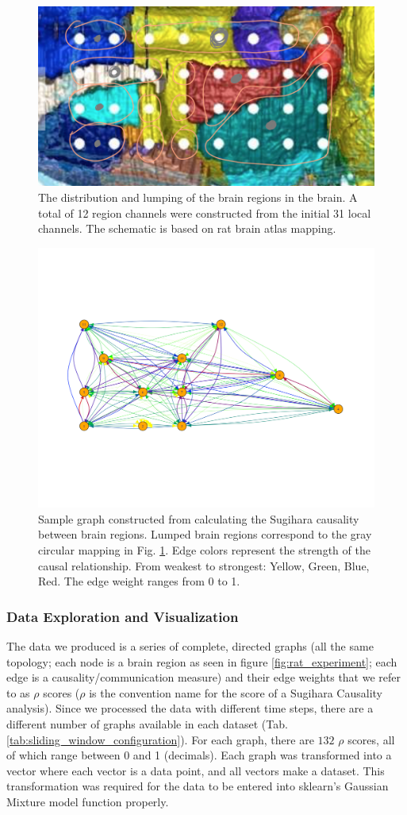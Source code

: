 \begin{figure}[H]
  \centering
  \includegraphics[width=0.65\linewidth]{figures/brain_region_lump.png}
  \caption{The distribution and lumping of the brain regions in the brain. A total of 12 region channels were constructed from the initial 31 local channels. The schematic is based on rat brain atlas mapping.}
  \label{fig:brain_region_lumping}
\end{figure}


\begin{figure}[H]
  \centering
  \includegraphics[width=0.55\linewidth]{figures/sample_graph.pdf}
  \caption{Sample graph constructed from calculating the Sugihara causality between brain regions. Lumped brain regions correspond to the gray circular mapping in Fig. \ref{fig:brain_region_lumping}. Edge colors represent the strength of the causal relationship. From weakest to strongest: Yellow, Green, Blue, Red. The edge weight ranges from 0 to 1.}
  \label{fig:sample_graph}
\end{figure}


\subsubsection{Data Exploration and Visualization}
The data we produced is a series of complete, directed graphs (all the same topology; each node is a brain region as seen in figure \ref{fig:rat_experiment}; each edge is a causality/communication measure) and their edge weights that we refer to as $\rho$ scores ($\rho$ is the convention name for the score of a Sugihara Causality analysis). Since we processed the data with different time steps, there are a different number of graphs available in each dataset (Tab. \ref{tab:sliding_window_configuration}). For each graph, there are $132$ $\rho$ scores, all of which range between 0 and 1 (decimals). Each graph was transformed into a vector where each vector is a data point, and all vectors make a dataset. This transformation was required for the data to be entered into sklearn's Gaussian Mixture model function properly.

